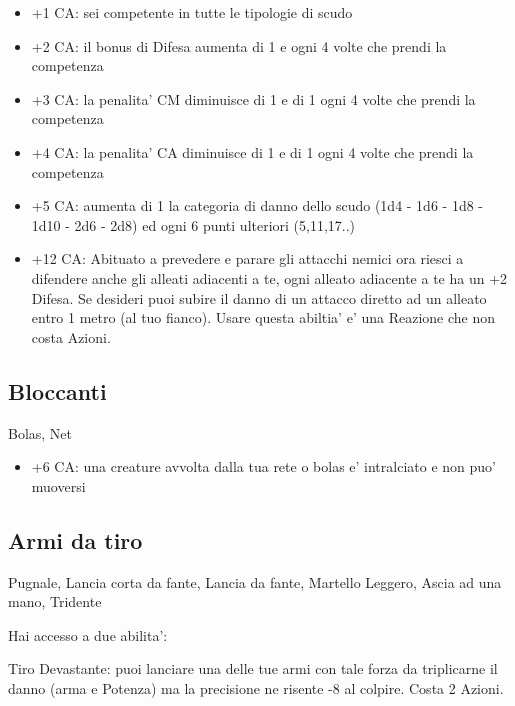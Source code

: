 \documentclass[a4paper,11pt,twoside,openany]{book}
\begin{document}
\begin{itemize}
	\item +1 CA: sei competente in tutte le tipologie di scudo

\item +2 CA: il bonus di Difesa aumenta di 1 e ogni 4 volte che prendi la competenza

\item +3 CA: la penalita' CM diminuisce di 1 e di 1 ogni 4 volte che prendi la competenza

\item +4 CA: la penalita' CA diminuisce di 1 e di 1 ogni 4 volte che prendi la competenza

\item +5 CA: aumenta di 1 la categoria di danno dello scudo (1d4 - 1d6 - 1d8 - 1d10 - 2d6 - 2d8) ed ogni 6 punti ulteriori (5,11,17..)

\item +12 CA: Abituato a prevedere e parare gli attacchi nemici ora riesci a difendere anche gli alleati adiacenti a te, ogni alleato adiacente a te ha un +2 Difesa. Se desideri puoi subire il danno di un attacco diretto ad un alleato entro 1 metro (al tuo fianco). Usare questa abiltia' e' una Reazione che non costa Azioni.

\end{itemize}

\subsection{Bloccanti} Bolas, Net

\begin{itemize}
	\item +6 CA: una creature avvolta dalla tua rete o bolas e' intralciato
e non puo' muoversi

\end{itemize}

\subsection{Armi da tiro} Pugnale, Lancia corta da fante, Lancia da fante, Martello Leggero, Ascia ad una mano, Tridente

Hai accesso a due abilita':

Tiro Devastante: puoi lanciare una delle tue armi con tale forza da triplicarne il danno (arma e Potenza) ma la precisione ne risente -8 al colpire. Costa 2 Azioni.
\end{document}
